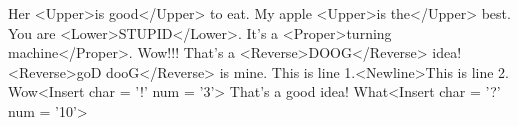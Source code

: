 Her <Upper>is good</Upper> to eat.
My apple <Upper>is the</Upper> best.
You are <Lower>STUPID</Lower>.
It's a <Proper>turning machine</Proper>.
Wow!!! That's a <Reverse>DOOG</Reverse> idea!
<Reverse>goD dooG</Reverse> is mine.
This is line 1.<Newline>This is line 2.
Wow<Insert char = '!' num = '3'> That's a good idea!
What<Insert char = '?' num = '10'>
